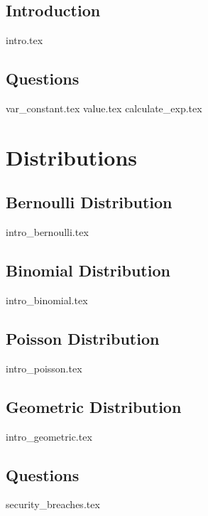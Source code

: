 \documentclass{exam}
\begin{document}
\subsection{Introduction}
{intro.tex}
\subsection{Questions}
\begin{questions}
{var_constant.tex}
{value.tex}
{calculate_exp.tex}
\end{questions}

\section{Distributions}
\subsection{Bernoulli Distribution}
{intro_bernoulli.tex}
\subsection{Binomial Distribution}
{intro_binomial.tex}
\subsection{Poisson Distribution}
{intro_poisson.tex}
\subsection{Geometric Distribution}
{intro_geometric.tex}
\subsection{Questions}
\begin{questions}
{security_breaches.tex}
\end{questions}
\end{document}
